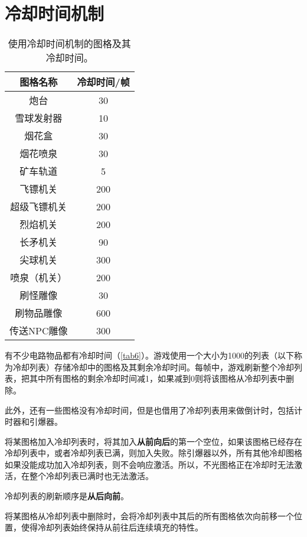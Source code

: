 \chapter{冷却时间机制}\label{app35}
\begin{table}[!ht]
\centering
\begin{tabular}{|c|c|}
\hline
图格名称&冷却时间/帧\\\hline\hline
炮台&30\\\hline
雪球发射器&10\\\hline
烟花盒&30\\\hline
烟花喷泉&30\\\hline
矿车轨道&5\\\hline
飞镖机关&200\\\hline
超级飞镖机关&200\\\hline
烈焰机关&200\\\hline
长矛机关&90\\\hline
尖球机关&300\\\hline
喷泉（机关）&200\\\hline
刷怪雕像&30\\\hline
刷物品雕像&600\\\hline
传送NPC雕像&300\\\hline
\end{tabular}
\caption{使用冷却时间机制的图格及其冷却时间。}\label{tab6}
\end{table}

有不少电路物品都有冷却时间（\autoref{tab6}）。游戏使用一个大小为1000的列表（以下称为冷却列表）存储冷却中的图格及其剩余冷却时间。每帧中，游戏刷新整个冷却列表，把其中所有图格的剩余冷却时间减1，如果减到0则将该图格从冷却列表中删除。

此外，还有一些图格没有冷却时间，但是也借用了冷却列表用来做倒计时，包括计时器和引爆器。

将某图格加入冷却列表时，将其加入\textbf{从前向后}的第一个空位，如果该图格已经存在冷却列表中，或者冷却列表已满，则加入失败。除引爆器以外，所有其他冷却图格如果没能成功加入冷却列表，则不会响应激活。所以，不光图格正在冷却时无法激活，在整个冷却列表已满时也无法激活。

冷却列表的刷新顺序是\textbf{从后向前}。

将某图格从冷却列表中删除时，会将冷却列表中其后的所有图格依次向前移一个位置，使得冷却列表始终保持从前往后连续填充的特性。